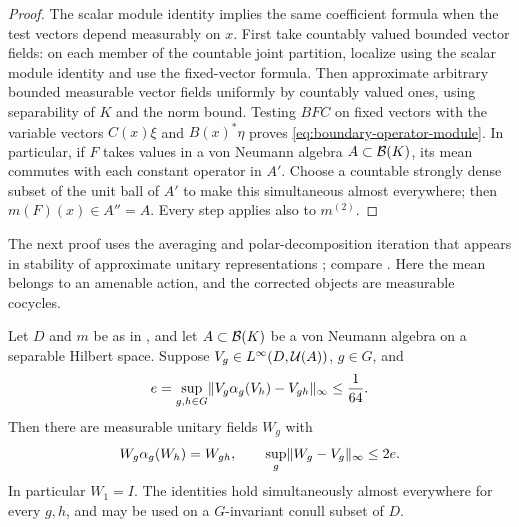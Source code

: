 \begin{proof}
The scalar module identity implies the same coefficient formula when
the test vectors depend measurably on $x$.  First take countably valued
bounded vector fields: on each member of the countable joint partition,
localize using the scalar module identity and use the fixed-vector
formula.  Then approximate arbitrary bounded measurable vector fields
uniformly by countably valued ones, using separability of $K$ and the
norm bound.  Testing $BFC$ on fixed vectors with the variable vectors
$C(x)\xi$ and $B(x)^*\eta$ proves
\eqref{eq:boundary-operator-module}.  In particular, if $F$ takes values
in a von Neumann algebra $A\subset\mathcal B(K)$, its mean commutes with each
constant operator in $A'$.  Choose a countable strongly dense subset of
the unit ball of $A'$ to make this simultaneous almost everywhere;
then $m(F)(x)\in A''=A$.  Every step applies also to $m^{(2)}$.
\end{proof}

The next proof uses the averaging and polar-decomposition iteration
that appears in stability of approximate unitary representations
\cite{Kazhdan1982,BurgerOzawaThom2013}; compare
\cite[Theorem~3.2 and its proof, pp.~116--117]{BurgerOzawaThom2013}.
Here the mean belongs to an amenable action, and the corrected objects
are measurable cocycles.

\begin{lemma}
\label{lem:boundary-correction}
Let $D$ and $m$ be as in , and let
$A\subset\mathcal B(K)$ be a von Neumann algebra on a separable Hilbert space.
Suppose $V_g\in L^\infty(D,\mathcal U(A))$, $g\in G$, and
\[
 e=\sup_{g,h\in G}\lVert V_g\alpha_g(V_h)-V_{gh}\rVert_\infty
 \le\frac1{64}.
\]
Then there are measurable unitary fields $W_g$ with
\begin{equation}\label{eq:boundary-exact-cocycle}
 W_g\alpha_g(W_h)=W_{gh},\qquad
 \sup_g\lVert W_g-V_g\rVert_\infty\le 2e.
\end{equation}
In particular $W_1=I$.  The identities hold simultaneously almost
everywhere for every $g,h$, and may be used on a $G$-invariant conull
subset of $D$.
\end{lemma}

